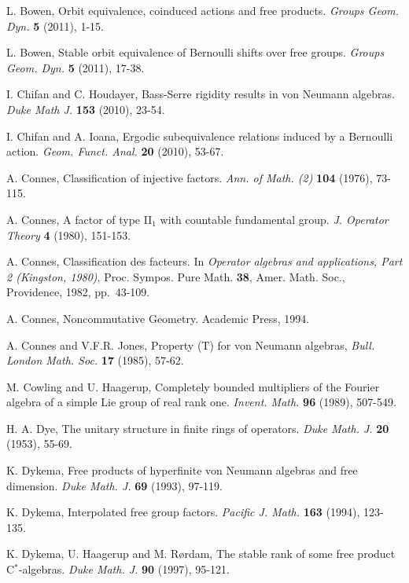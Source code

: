 \documentclass[a4paper,11pt]{amsart}
\numberwithin{equation}{section}
\begin{document}
\begin{thebibliography}{ABC90}

 L. Bowen, Orbit equivalence, coinduced actions and free products. {\it Groups Geom. Dyn.} {\bf 5} (2011), 1-15.

 L. Bowen, Stable orbit equivalence of Bernoulli shifts over free groups. {\it Groups Geom. Dyn.} {\bf 5} (2011), 17-38.

 {I. Chifan and C. Houdayer}, Bass-Serre rigidity results in von Neumann algebras.
{\it Duke Math J.} {\bf 153} (2010), 23-54.

 {I. Chifan and A. Ioana},
Ergodic subequivalence relations induced by a Bernoulli action. {\it  Geom. Funct. Anal.} {\bf 20} (2010), 53-67.

 {A. Connes},
Classification of injective factors. {\it Ann. of Math. (2)} {\bf 104} (1976), 73-115.

 {A. Connes}, A factor of type II$_1$ with
  countable fundamental group. {\it J. Operator Theory} {\bf 4}
  (1980), 151-153.

 {A. Connes},
Classification des facteurs. In {\it Operator algebras and applications, Part 2 (Kingston, 1980)},
Proc. Sympos. Pure Math. {\bf 38}, Amer. Math. Soc., Providence, 1982, pp.\ 43-109.

 {A. Connes}, Noncommutative Geometry. Academic Press, 1994.

 {A. Connes and V.F.R. Jones}, Property (T) for von
Neumann algebras, {\it Bull. London Math. Soc.} {\bf 17} (1985),
57-62.

 {M. Cowling and U. Haagerup}, Completely bounded multipliers of the Fourier algebra of a simple Lie group of real rank one. {\it Invent. Math.} {\bf 96} (1989), 507-549.

 {H. A. Dye},
The unitary structure in finite rings of operators.
{\it Duke Math. J.} {\bf 20} (1953), 55-69.

 {K. Dykema},
Free products of hyperfinite von Neumann algebras and free dimension.
{\it Duke Math. J.} {\bf 69} (1993), 97-119.

 K. Dykema,
Interpolated free group factors.
{\it Pacific J. Math.} {\bf 163} (1994), 123-135.

 K. Dykema, U. Haagerup and M. R{\o}rdam,
The stable rank of some free product C$^*$-algebras.
{\it Duke Math. J.} {\bf 90} (1997), 95-121.


\end{thebibliography}
\end{document}
